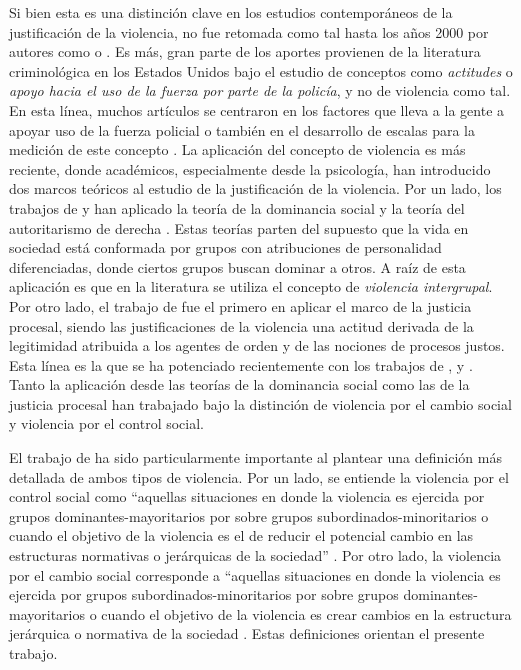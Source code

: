 \documentclass[12pt,twoside]{templates/facsothesis}
\begin{document}
Si bien esta es una distinción clave en los estudios contemporáneos de la justificación de la violencia, no fue retomada como tal hasta los años 2000 por autores como \citet{Jackson2013} o \citet{Gerber2016}. Es más, gran parte de los aportes provienen de la literatura criminológica en los Estados Unidos bajo el estudio de conceptos como \emph{actitudes} o \emph{apoyo hacia el uso de la fuerza por parte de la policía}, y no de violencia como tal. En esta línea, muchos artículos se centraron en los factores que lleva a la gente a apoyar uso de la fuerza policial \citep{Gamson1970, Arthur1993, Arthur1994, Thompson2004, Perkins2006, Johnson2009} o también en el desarrollo de escalas para la medición de este concepto \citep{Barkan1998, Jefferis2011}. La aplicación del concepto de violencia es más reciente, donde académicos, especialmente desde la psicología, han introducido dos marcos teóricos al estudio de la justificación de la violencia. Por un lado, los trabajos de \citet{Henry2005} y \citet{Gerber2017b} han aplicado la teoría de la dominancia social \citep{Sidanius1999} y la teoría del autoritarismo de derecha \citep{Altemeyer1988}. Estas teorías parten del supuesto que la vida en sociedad está conformada por grupos con atribuciones de personalidad diferenciadas, donde ciertos grupos buscan dominar a otros. A raíz de esta aplicación es que en la literatura se utiliza el concepto de \emph{violencia intergrupal}. Por otro lado, el trabajo de \citet{Jackson2013} fue el primero en aplicar el marco de la justicia procesal, siendo las justificaciones de la violencia una actitud derivada de la legitimidad atribuida a los agentes de orden y de las nociones de procesos justos. Esta línea es la que se ha potenciado recientemente con los trabajos de \citet{Gerber2017a}, \citet{Gerber2017b} y \citet{Bradford2017}. Tanto la aplicación desde las teorías de la dominancia social como las de la justicia procesal han trabajado bajo la distinción de violencia por el cambio social y violencia por el control social.

El trabajo de \citet{Gerber2017a} ha sido particularmente importante al plantear una definición más detallada de ambos tipos de violencia. Por un lado, se entiende la violencia por el control social como ``aquellas situaciones en donde la violencia es ejercida por grupos dominantes-mayoritarios por sobre grupos subordinados-minoritarios o cuando el objetivo de la violencia es el de reducir el potencial cambio en las estructuras normativas o jerárquicas de la sociedad'' \citep[pp.~3-4, traducción propia]{Gerber2017a}. Por otro lado, la violencia por el cambio social corresponde a ``aquellas situaciones en donde la violencia es ejercida por grupos subordinados-minoritarios por sobre grupos dominantes-mayoritarios o cuando el objetivo de la violencia es crear cambios en la estructura jerárquica o normativa de la sociedad \citep[p.4, traducción mía]{Gerber2017a}. Estas definiciones orientan el presente trabajo.
\end{document}

